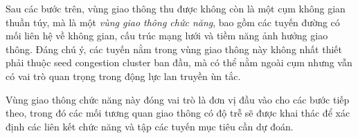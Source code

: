 Sau các bước trên, vùng giao thông thu được không còn là một cụm không gian thuần túy,
mà là một \textit{vùng giao thông chức năng}, bao gồm các tuyến đường có mối liên hệ về
không gian, cấu trúc mạng lưới và tiềm năng ảnh hưởng giao thông. Đáng chú ý, các tuyến
nằm trong vùng giao thông này không nhất thiết phải thuộc seed congestion cluster ban đầu,
mà có thể nằm ngoài cụm nhưng vẫn có vai trò quan trọng trong động lực lan truyền ùn tắc.

Vùng giao thông chức năng này đóng vai trò là đơn vị đầu vào cho các bước tiếp theo, trong
đó các mối tương quan giao thông có độ trễ sẽ được khai thác để xác định các liên kết chức
năng và tập các tuyến mục tiêu cần dự đoán.
